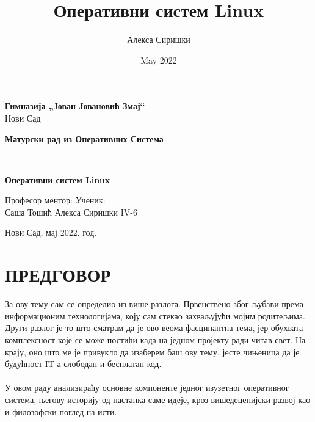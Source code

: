 \documentclass[a4paper,14pt]{article}
\title{Оперативни систем Linux}
\author{Алекса Сиришки}
\date{May 2022}
\begin{document}
\pagestyle{empty}
\begin{center}
\textbf{Гимназија „Јован Јовановић Змај“}
\\
Нови Сад
\end{center}
\vfill
\begin{center}
	\begin{large}
		\textbf{Матурски рад из Оперативних Система}
		\bigskip 
	\end{large}
	\\
	\begin{huge}
        \textbf{Оперативни систем Linux}
	\end{huge}
\end{center}
\vfill
\begin{normalsize}
Професор ментор:
\hfill
Ученик:
\\
Саша Тошић
\hfill
Алекса Сиришки IV-6
\end{normalsize}
\vfill
\begin{center}
Нови Сад, мај 2022. год.
\end{center}
\newpage

\pagestyle{plain}
\section*{ПРЕДГОВОР}
За ову тему сам се определио из више разлога. Првенствено због љубави према информационим технологијама, коју сам стекао захваљујући мојим родитељима. Други разлог је то што сматрам да је ово веома фасцинантна тема, јер обухвата комплексност које се може постићи када на једном пројекту ради читав свет. На крају, оно што ме је привукло да изаберем баш ову тему, јесте чињеница да је будућност IT-а слободан и бесплатан код.
\\\\
У овом раду анализираћу основне компоненте једног изузетног оперативног система, његову историју од настанка саме идеје, кроз вишедеценијски развој као и филозофски поглед на исти.
\newpage

\renewcommand{\contentsname}{САДРЖАЈ}
\tableofcontents
\newpage

\pagestyle{fancy}
\fancyhf{}
\cfoot{\thepage}
\end{document}
